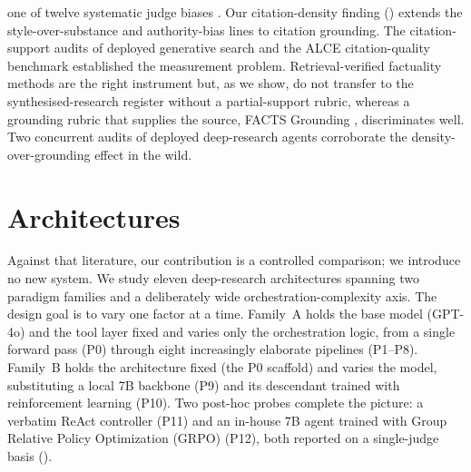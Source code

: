 \documentclass[11pt]{article}
\begin{document}
one of twelve systematic judge biases \citep{calm2024}. Our citation-density finding
() extends the style-over-substance and authority-bias lines
to citation grounding. The citation-support audits of deployed generative
search \citep{liu2023verifiability} and the ALCE citation-quality benchmark
\citep{gao2023alce} established the measurement problem. Retrieval-verified factuality
methods \citep{min2023factscore,wei2024safe} are the right instrument but, as we show,
do not transfer to the synthesised-research register without a partial-support rubric,
whereas a grounding rubric that supplies the source, FACTS Grounding
\citep{factsgrounding2025}, discriminates well. Two concurrent audits of deployed
deep-research agents \citep{refhalluc2026,citednotverified2026} corroborate the
density-over-grounding effect in the wild.

\section{Architectures}\label{sec:taxonomy}

Against that literature, our contribution is a controlled comparison; we introduce no
new system. We study eleven deep-research architectures spanning two paradigm families and
a deliberately wide orchestration-complexity axis. The design goal is to vary one
factor at a time. Family~A holds the base model
(GPT-4o) and the tool layer fixed and varies only the orchestration logic, from a
single forward pass (P0) through eight increasingly elaborate pipelines (P1--P8).
Family~B holds the architecture fixed (the P0 scaffold) and varies the model,
substituting a local 7B backbone (P9) and its descendant trained with
reinforcement learning (P10). Two post-hoc probes complete the picture: a verbatim ReAct
controller (P11) and an in-house 7B agent trained with Group Relative Policy Optimization (GRPO) (P12), both reported on a
single-judge basis ().
\end{document}
